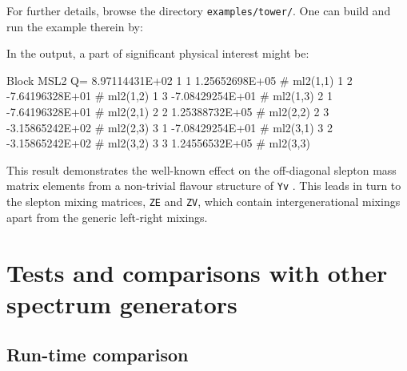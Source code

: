 \documentclass[final,3p,11pt,pdflatex]{elsarticle}
\newcommand{\code}[1]{\lstinline|#1|}  %
\begin{document}
For further details, browse the directory \code{examples/tower/}.
One can build and run the example therein by:
In the output,
a part of significant physical interest might be:
\begin{numlstlisting}
Block MSL2 Q=   8.97114431E+02
  1  1     1.25652698E+05   # ml2(1,1)
  1  2    -7.64196328E+01   # ml2(1,2)
  1  3    -7.08429254E+01   # ml2(1,3)
  2  1    -7.64196328E+01   # ml2(2,1)
  2  2     1.25388732E+05   # ml2(2,2)
  2  3    -3.15865242E+02   # ml2(2,3)
  3  1    -7.08429254E+01   # ml2(3,1)
  3  2    -3.15865242E+02   # ml2(3,2)
  3  3     1.24556532E+05   # ml2(3,3)
\end{numlstlisting}
This result demonstrates the well-known effect on
the off-diagonal slepton mass matrix elements
from a non-trivial flavour structure of \code{Yv}
\cite{Borzumati:1986qx}.
This leads in turn to the slepton mixing
matrices, \code{ZE} and \code{ZV},
which contain intergenerational mixings apart from the
generic left-right mixings.

\section{Tests and comparisons with other spectrum generators}
\label{sec:comparison}

\subsection{Run-time comparison}
\end{document}
